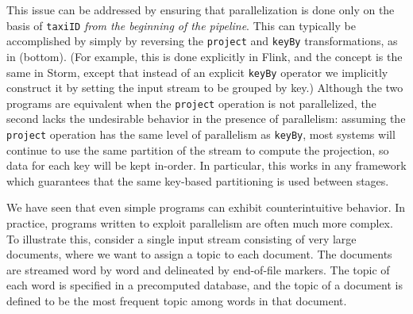 This issue can be addressed by ensuring that parallelization is done only on the basis of \texttt{taxiID} \emph{from the beginning of the pipeline}.
This can typically be accomplished by simply by reversing the \texttt{project} and \texttt{keyBy} transformations, as in  (bottom).
(For example, this is done explicitly in Flink, and the concept is the same in Storm, except that instead of an explicit \texttt{keyBy} operator we implicitly construct it by setting the input stream to be grouped by key.)
Although the two programs are equivalent when the \texttt{project} operation is not parallelized, the second lacks the undesirable behavior in the presence of parallelism: assuming the \texttt{project} operation has the same level of parallelism as \texttt{keyBy}, most systems will continue to use the same partition of the stream to compute the projection, so data for each key will be kept in-order. In particular, this works in any framework which guarantees that the same key-based partitioning is used between stages.

We have seen that even simple programs can exhibit counterintuitive behavior. In practice, programs written to exploit parallelism are often much more complex. To illustrate this, consider a single input stream consisting of very large documents, where we want to assign a topic to each document. The documents are streamed word by word and delineated by end-of-file markers.
The topic of each word is specified in a precomputed database, and the topic of a document is defined to be the most frequent topic among words in that document.

